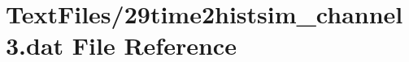 \hypertarget{29time2histsim__channel3_8dat}{}\section{Text\+Files/29time2histsim\+\_\+channel3.dat File Reference}
\label{29time2histsim__channel3_8dat}
